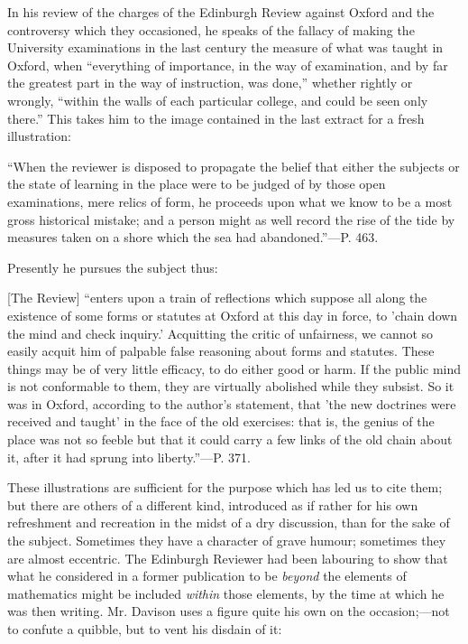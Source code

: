 In his review of the charges of the Edinburgh
Review against Oxford and the controversy which they occasioned, he
speaks of the fallacy of making the University examinations in the
last century the measure of what was taught in Oxford, when ``everything
of importance, in the way of examination, and by far the greatest part
in the way of instruction, was done,'' whether rightly or wrongly, ``within
the walls of each particular college, and could be seen only there.''
This takes him to the image contained in the last extract for a fresh
illustration:

``When
the reviewer is disposed to propagate the belief that either the
subjects or the state of learning in the place were to be judged of by
those open examinations, mere relics of form, he proceeds upon what we
know to be a most gross historical mistake; and a person might as well
record the rise of the tide by measures taken on a shore which the sea
had abandoned.''—P. 463.

Presently he pursues the subject thus:

[The Review] ``enters
upon a train of reflections which suppose all along the existence of
some forms or statutes at Oxford at this day in force, to 'chain down
the mind and check inquiry.' Acquitting the critic of unfairness, we
cannot so easily acquit him of palpable false reasoning about forms
and statutes. These things may be of very little efficacy, to do
either good or harm. If the public mind is not conformable to them,
they are virtually abolished while they subsist. So it was in Oxford,
according to the author's statement, that 'the new doctrines were
received and taught' in the face of the old exercises: that is, the
genius of the place was not so feeble but that it could carry a few
links of the old chain about it, after it had sprung into liberty.''—P.
371.

These illustrations are sufficient for the
purpose which has led us to cite them; but there are others of a
different kind, introduced as if rather for his own refreshment and
recreation in the midst of a dry discussion, than for the sake of the
subject. Sometimes they have a character of grave humour; sometimes
they are almost eccentric. The Edinburgh Reviewer had been labouring
to show that what he considered in a former publication to be \emph{beyond}
the elements of mathematics might be included \emph{within} those
elements, by the time at which he was then writing. Mr. Davison uses a
figure quite his own on the occasion;—not to confute a quibble, but
to vent his disdain of it:


